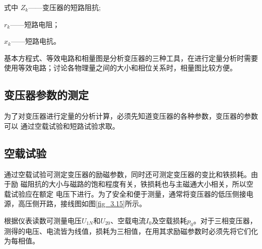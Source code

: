 \documentclass{book}
\begin{document}
式中  ${{Z}_{k}}$——变压器的短路阻抗;

${{r}_{k}}$——短路电阻；

${{x}_{k}}$——短路电抗。

基本方程式、等效电路和相量图是分析变压器的三种工具，在进行定量分析时需要使用等效电路；讨论各物理量之间的大小和相位关系时，相量图比较方便。

\subsection{变压器参数的测定}
为了对变压器进行定量的分析计算，必须先知道变压器的各种参数，变压器的参数可以 通过空载试验和短路试验求取。

\subsection{空载试验}
通过空载试验可测定变压器的励磁参数，同时还可测定变压器的变比和铁损耗。由于励 磁阻抗的大小与磁路的饱和程度有关，铁损耗也与主磁通大小相关，所以空载试验应在额定 电压下进行。为了安全和便于测量，通常将变压器的低压侧接电源，高压侧开路，接线图如图\ref{fig_3.15}所示。

根据仪表读数可测量电压${{U}_{1N}}$和${{U}_{20}}$、空载电流${{I}_{0}}$及空载损耗${{p}_{0}}$。对于三相变压器，测得的电压、电流皆为线值，损耗为三相值，在用其求励磁参数时必须先将它们化为每相值。
\end{document}

